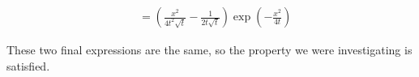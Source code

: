 \documentclass[letterpaper,11pt]{article}
\newcommand{\parens}[1]{\left(#1\right)}
\begin{document}
\begin{enumerate}
\begin{enumerate}
\begin{align*}
{{                        }
                    } \\
                    &=
                    \parens{
                        \frac{
                            x^2
                        }{
                            4 t^2 \sqrt{t}
                        }
                        -
                        \frac{
                            1
                        }{
                            2 t \sqrt{t}
                        }
                    }
                    \exp\parens{
                        - \frac{
                            x^2
                        }{
                            4 t
                        }
                    }
                \end{align*}

                These two final expressions are the same, so the property we
                were investigating is satisfied.
        \end{enumerate}
\end{enumerate}
\end{document}
